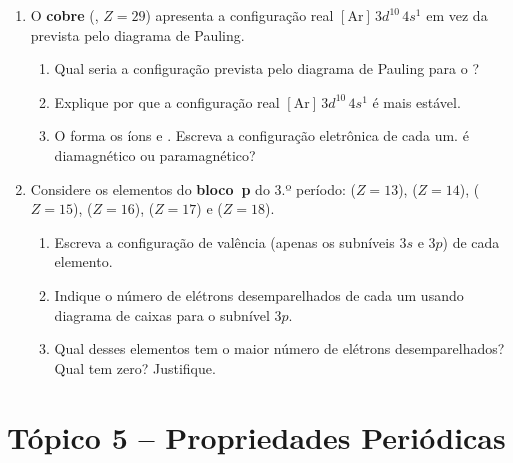\documentclass[10pt,a4paper]{article}
\begin{document}
\begin{enumerate}[resume]
\item O \textbf{cobre} (, $Z=29$) apresenta a configuração
  real $[\text{Ar}]\,3d^{10}\,4s^1$ em vez da prevista pelo
  diagrama de Pauling.
  \begin{enumerate}
    \item Qual seria a configuração prevista pelo diagrama de
          Pauling para o ?
    \item Explique por que a configuração real
          $[\text{Ar}]\,3d^{10}\,4s^1$ é mais estável.
    \item O  forma os íons  e .
          Escreva a configuração eletrônica de cada um.
           é diamagnético ou paramagnético?
  \end{enumerate}

\item Considere os elementos do \textbf{bloco~p} do 3.º período:
   ($Z=13$),  ($Z=14$),  ($Z=15$),
   ($Z=16$),  ($Z=17$) e  ($Z=18$).
  \begin{enumerate}
    \item Escreva a configuração de valência (apenas os
          subníveis $3s$ e $3p$) de cada elemento.
    \item Indique o número de elétrons desemparelhados de
          cada um usando diagrama de caixas para o subnível $3p$.
    \item Qual desses elementos tem o maior número de elétrons
          desemparelhados? Qual tem zero? Justifique.
  \end{enumerate}

\end{enumerate}

\newpage
\section*{Tópico 5 \; -- \; Propriedades Periódicas}
\end{document}
